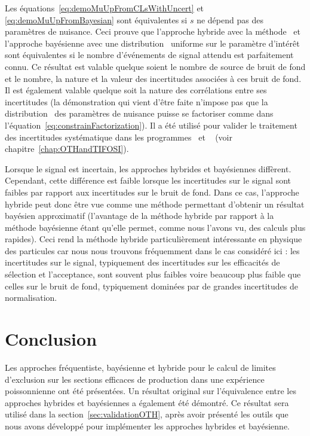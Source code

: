 Les \'equations~\ref{eq:demoMuUpFromCLsWithUncert} et \ref{eq:demoMuUpFromBayesian} sont \'equivalentes si $s$ ne d\'epend pas des param\`etres de nuisance. 
Ceci prouve que l'approche hybride avec la m\'ethode \CLs~et l'approche bay\'esienne avec une distribution \prior~uniforme sur le param\`etre d'int\'er\^et sont \'equivalentes si le nombre d'\'ev\'enements de signal attendu est parfaitement connu. 
Ce r\'esultat est valable quelque soient le nombre de source de bruit de fond et le nombre, la nature et la valeur des incertitudes associ\'ees \`a ces bruit de fond. 
Il est \'egalement valable quelque soit la nature des corr\'elations entre ses incertitudes (la d\'emonstration qui vient d'\^etre faite n'impose pas que la distribution \prior~des param\`etres de nuisance puisse se factoriser comme dans l'\'equation~\ref{eq:constrainFactorization}). 
Il a \'et\'e utilis\'e pour valider le traitement des incertitudes syst\'ematique dans les programmes \opthylic~et \tifosi~
(voir chapitre~\ref{chap:OTHandTIFOSI}).

Lorsque le signal est incertain, les approches hybrides et bayésiennes diffèrent. Cependant, cette différence est faible lorsque les incertitudes sur le signal sont faibles par rapport aux incertitudes sur le bruit de fond. Dans ce cas, l'approche hybride peut donc être vue comme une méthode permettant d'obtenir un résultat bayésien approximatif (l'avantage de la méthode hybride par rapport à la méthode bayésienne étant qu'elle permet, comme nous l'avons vu, des calculs plus rapides). Ceci rend la méthode hybride particulièrement intéressante en physique des particules car nous nous trouvons fréquemment dans le cas considéré ici : les incertitudes sur le signal, typiquement des incertitudes sur les efficacités de sélection et l'acceptance, sont souvent plus faibles voire beaucoup plus faible que celles sur le bruit de fond, typiquement dominées par de grandes incertitudes de normalisation.

\section{Conclusion}

Les approches fr\'equentiste, bay\'esienne et hybride pour le calcul de limites d'exclusion sur les sections efficaces de production dans une exp\'erience poissonnienne ont \'et\'e pr\'esent\'ees. Un r\'esultat original sur l'\'equivalence entre les approches hybrides et bay\'esiennes a \'egalement \'et\'e d\'emontr\'e. Ce r\'esultat sera utilis\'e dans la section~\ref{sec:validationOTH}, apr\`es avoir présenté les outils que nous avons d\'evelopp\'e pour impl\'ementer les approches hybrides et bay\'esienne.

